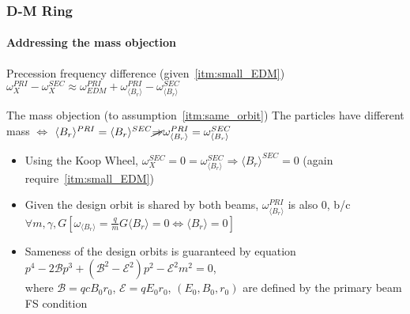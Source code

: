 \documentclass{beamer}
\newcommand{\w}{\omega}
\newcommand{\avg}[1]{\langle{#1}\rangle}
\begin{document}
\begin{frame}\frametitle{D-M Ring}\framesubtitle{Addressing the mass
    objection}
  \begin{block}{Precession frequency difference
      (given~\ref{itm:small_EDM})}
    $\w_X^{PRI} - \w_X^{SEC} \approx \w_{EDM}^{PRI} + \w_{\avg{B_r}}^{PRI} - \w_{\avg{B_r}}^{SEC}$
  \end{block}
  \begin{block}{The mass objection (to assumption~\ref{itm:same_orbit})}
    The particles have different mass $\Leftrightarrow$ $\avg{B_r}^{PRI} =
    \avg{B_r}^{SEC} \cancel{\Rightarrow}\w_{\avg{B_r}}^{PRI} = \w_{\avg{B_r}}^{SEC}$
  \end{block}
  \begin{itemize}
  \item Using the Koop Wheel, $\w_X^{SEC} = 0 = \w_{\avg{B_r}}^{SEC} \Rightarrow \avg{B_r}^{SEC} = 0$
    (again require~\ref{itm:small_EDM})
  \item Given the design orbit is shared by both beams, $\w_{\avg{B_r}}^{PRI}$ is also 0, b/c
    $\forall m,\gamma,G\left[\w_{\avg{B_r}}=\frac qm G\avg{B_r} = 0\Leftrightarrow \avg{B_r}=0\right]$
  \item Sameness of the design orbits is guaranteed by equation
    $p^4 - 2\mathcal B p^3 + (\mathcal B^2-\mathcal E^2)p^2 - \mathcal E^2m^2 = 0$,\\ where
    $\mathcal B=qcB_0r_0$, $\mathcal E=qE_0r_0$, $(E_0, B_0, r_0)$ are defined by the primary beam FS condition
  \end{itemize}
\end{frame}
\end{document}
